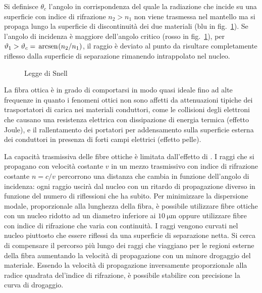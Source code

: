 Si definisce  $\theta_c$ l'angolo in corrispondenza del quale la radiazione che incide su una superficie con indice di rifrazione $n_2>n_1$ non viene trasmessa nel mantello ma si propaga lungo la superficie di discontinuità dei due materiali (blu in fig.~\ref{fig:legge_Snell}). Se l'angolo di incidenza è maggiore dell'angolo critico (rosso in fig.~\ref{fig:legge_Snell}), per $\vartheta_1>\vartheta_c=\,{\operatorname{arcsen}}^{}\!\left({n_2/n_1}\right)$, il raggio è deviato al punto da risultare completamente riflesso dalla superficie di separazione rimanendo intrappolato nel nucleo.
\begin{figure}[!ht]
\centering
{}
\caption{Legge di Snell}
\label{fig:legge_Snell}
\end{figure}

La fibra ottica è in grado di comportarsi in modo quasi ideale fino ad alte frequenze in quanto i fenomeni ottici non sono affetti da attenuazioni tipiche dei trasportatori di carica nei materiali conduttori, come le collisioni degli elettroni che causano una resistenza elettrica con dissipazione di energia termica (effetto Joule), e il rallentamento dei portatori per addensamento sulla superficie esterna dei conduttori in presenza di forti campi elettrici (effetto pelle).

La capacità trasmissiva delle fibre ottiche è limitata dall'effetto di . I raggi che si propagano con velocità costante $v$ in un mezzo trasmissivo con indice di rifrazione costante $n=c/v$ percorrono una distanza che cambia in funzione dell'angolo di incidenza: ogni raggio uscirà dal nucleo con un ritardo di propagazione diverso in funzione del numero di riflessioni che ha subito. Per minimizzare la dispersione modale, proporzionale alla lunghezza della fibra, è possibile utilizzare fibre ottiche  con un nucleo ridotto ad un diametro inferiore ai $\SI{10}{\micro\meter}$ oppure utilizzare fibre  con indice di rifrazione che varia con continuità. I raggi vengono curvati nel nucleo piuttosto che essere riflessi da una superficie di separazione netta. Si cerca di compensare il percorso più lungo dei raggi che viaggiano per le regioni esterne della fibra aumentando la velocità di propagazione con un minore drogaggio del materiale. Essendo la velocità di propagazione inversamente proporzionale alla radice quadrata del'indice di rifrazione, è possibile stabilire con precisione la curva di drogaggio.

